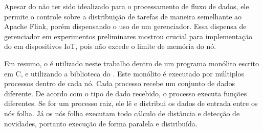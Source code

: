 Apesar do \mpi não ter sido idealizado para o processamento de fluxo de dados, ele
permite o controle sobre a distribuição de tarefas de maneira
semelhante ao Apache Flink, porém dispensando o uso de um
gerenciador. Essa dispensa de gerenciador em experimentos preliminares mostrou
crucial para implementação do \mfog em dispositivos IoT, pois não excede o limite de
memória do nó.

Em resumo, o \mpi é utilizado neste trabalho dentro de um programa monólito escrito em C, e
utilizando a biblioteca do \mpi. Este monólito é executado por múltiplos processos
dentro de cada nó. Cada processo recebe um conjunto de dados diferente. De
acordo com o tipo de dado recebido, o processo executa funções diferentes. Se
for um processo raiz, ele lê e distribui os dados de entrada entre os nós folha.
Já os nós folha executam todo cálculo de distância e detecção de novidades,
portanto execução de forma paralela e distribuída.

